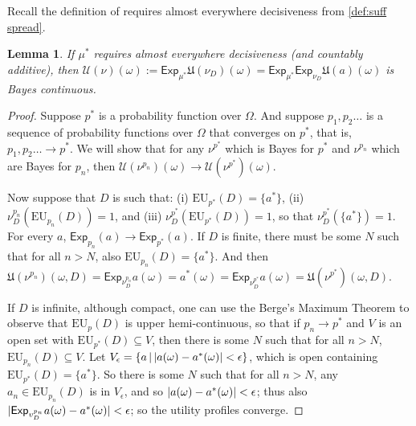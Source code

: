 \documentclass[a4paper]{article}
\newtheorem{lemma}[theorem]{Lemma}
\newcommand\Exp{\mathsf{Exp}}
\newcommand\EU{\mathrm{EU}}
\newcommand\U{\mathfrak{U}} %
\newcommand\Uwald{\mathcal{U}} %
\newcommand{\todoinfo}[2][]{\todo[backgroundcolor=orange!80,bordercolor=black,linecolor=gray!80, #1,inline,caption={}]{#2}}
\newcommand\SetDelimiter[1][]{
	\nonscript\,#1\vert \allowbreak \nonscript\,\mathopen{}}
\providecommand\given{\SetDelimiter}
\DeclarePairedDelimiter\abs{\lvert}{\rvert}%
\newenvironment{CCM rewritten}
{\begingroup\color{blue}} %
{\endgroup}              %
\begin{document}
Recall the definition of requires almost everywhere decisiveness from \cref{def:suff spread}.
\begin{lemma}\label{thm:cct-appln:cts}
	If ${\mu^*}$ requires almost everywhere decisiveness (and countably additive), then $\Uwald(\nu)(\omega):=\Exp_{\mu^*}\U({\nu_{D}})(\omega)=\Exp_{\mu^*}\Exp_{\nu_D}\U(a)(\omega)$ is Bayes continuous. 
\end{lemma}
\begin{proof}
Suppose $p^*$ is a probability function over $\Omega$. And suppose $p_1,p_2\ldots$ is a sequence of probability functions over $\Omega$ that converges on $p^*$, that is, $p_1,p_2\ldots \longrightarrow p^*$. We will show that for any $\nu^{p^*}$ which is Bayes for $p^*$ and $\nu^{p_n}$ which are Bayes for $p_n$, then $\Uwald(\nu^{p_n})(\omega)\longrightarrow\Uwald(\nu^{p^*})(\omega)$. 

Now suppose that $D$ is such that: (i) $\EU_{p^*}(D)= \{a^*\}$, (ii) $\nu^{p_n}_D(\EU_{p_n}(D))=1$, and (iii) $\nu^{p^*}_D(\EU_{p^*}(D))=1$, so that $\nu^{p^*}_D(\{a^*\}) = 1$. 
For every $a$,  $\Exp_{p_n}(a)\longrightarrow\Exp_{p^*}(a)$. If $D$ is finite, there must be some $N$ such that for all $n>N$, also $\EU_{p_n}(D)=\{a^*\}$. And then $\U(\nu^{p_n})(\omega, D)=\Exp_{\nu^{p_n}_D}a(\omega)=a^*(\omega)= \Exp_{\nu^{p^*}_D}a(\omega) = \U(\nu^{p^*})(\omega, D)$.  

If $D$ is infinite, although compact, one can use the Berge's Maximum Theorem to observe that $\EU_p(D)$ is upper hemi-continuous, so that if $p_n\longrightarrow p^*$ and $V$ is an open set with $\EU_{p^*}(D)\subseteq V$, then there is some $N$ such that for all $n>N$, $\EU_{p_n}(D)\subseteq V$. Let $V_{\epsilon}=\{a\given \abs{a(\omega)-a^*(\omega)}<\epsilon\}$, which is open containing $\EU_{p^*}(D)=\{a^*\}$. So there is some $N$ such that for all $n>N$, any $a_n\in\EU_{p_n}(D)$ is in $V_{\epsilon}$, and so $\abs{a(\omega)-a^*(\omega)}<\epsilon$; thus also $\abs{\Exp_{v_D^{p_n}} a(\omega)- a^*(\omega)}<\epsilon$; so the utility profiles converge. 



\end{proof}
\end{document}
